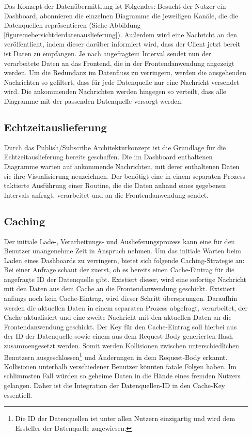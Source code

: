 Das Konzept der Datenübermittlung ist Folgendes: Besucht der Nutzer ein Dashboard,
abonnieren die einzelnen Diagramme die jeweiligen Kanäle, die die Datenquellen 
repräsentieren (Siehe Abbildung \ref{figure:uebersichtderdatenauslieferung}).
Außerdem wird eine Nachricht an den  veröffentlicht,
indem dieser darüber informiert wird, dass der Client jetzt bereit ist Daten zu empfangen.
Je nach angefragtem Interval sendet nun der  verarbeitete
Daten an das Frontend, die in der Frontendanwendung angezeigt werden. Um die
Redundanz im Datenfluss zu verringern, werden die ausgehenden Nachrichten
so gefiltert, dass für jede Datenquelle nur eine Nachricht versendet wird. Die ankommenden
Nachrichten werden hingegen so verteilt, dass alle Diagramme mit der passenden Datenquelle
versorgt werden.

\subsection{Echtzeitauslieferung}
\label{subsec:echtzeitauslieferung}
Durch das Publish/Subscribe Architekturkonzept ist die Grundlage für die Echtzeitauslieferung
bereits geschaffen. Die im Dashboard enthaltenen Diagramme warten auf ankommende Nachrichten,
mit derer enthaltenen Daten sie ihre Visualisierung neuzeichnen. Der 
benötigt eine in einem separaten Prozess taktierte Ausführung einer Routine, die die Daten
anhand eines gegebenen Intervals anfragt, verarbeitet und an die Frontendanwendung sendet.

\subsection{Caching}
\label{subsec:caching}
Der initiale Lade-, Verarbeitungs- und Auslieferungsprozess kann eine für den Benutzer
unangenehme Zeit in Anspruch nehmen. Um das initiale Warten beim Laden eines Dashboards
zu verringern, bietet sich folgende Caching-Strategie an: Bei einer Anfrage schaut
der  zuerst, ob es bereits einen Cache-Eintrag für die
angefragte ID der Datenquelle gibt. Existiert dieser, wird eine sofortige Nachricht
mit den Daten aus dem Cache an die Frontendanwendung geschickt. Existiert anfangs noch
kein Cache-Eintrag, wird dieser Schritt übersprungen. Daraufhin werden
die aktuellen Daten in einem separaten Prozess abgefragt, verarbeitet, der Cache
aktualisiert und eine zweite Nachricht mit den aktuellen Daten an die Frontendanwendung
geschickt. Der Key für den Cache-Eintrag soll hierbei aus der ID der Datenquelle sowie
einem aus dem Request-Body generierten Hash zusammengesetzt werden. Somit werden
Kollisionen zwischen unterschiedlichen Benutzern ausgeschlossen\footnote{Die ID der Datenquellen ist
unter allen Nutzern einzigartig und wird dem Ersteller der Datenquelle zugewiesen.}
und Änderungen in dem Request-Body erkannt. Kollisionen unterhalb verschiedener
Benutzer könnten fatale Folgen haben. Im schlimmsten Fall würden so geheime Daten
in die Hände eines fremden Nutzers gelangen. Daher ist die Integration der Datenquellen-ID
in den Cache-Key essentiell.

